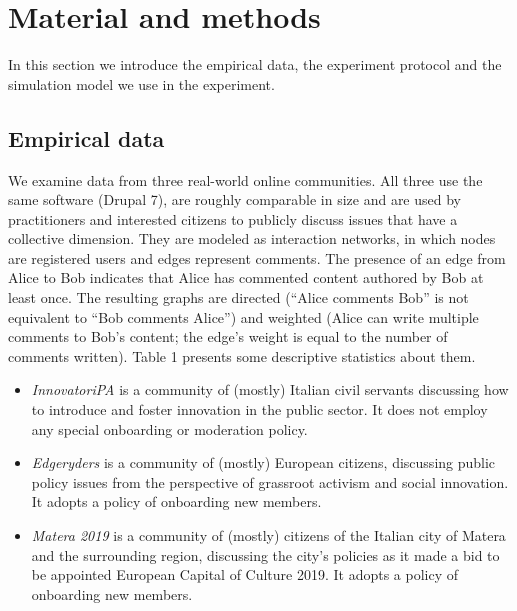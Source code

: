 \section{Material and methods}

In this section we introduce the empirical data, the experiment protocol and the simulation model we use in the experiment. 

\subsection{Empirical data}

We examine data from three real-world online communities. All three use the same software (Drupal 7), are roughly comparable in size and are used by practitioners and interested citizens to publicly discuss issues that have a collective dimension. They are modeled as interaction networks, in which nodes are registered users and edges represent comments. The presence of an edge from Alice to Bob indicates that Alice has commented content authored by Bob at least once.  The resulting graphs are directed (``Alice comments Bob'' is not equivalent to ``Bob comments Alice'') and weighted (Alice can write multiple comments to Bob's content; the edge's weight is equal to the number of comments written). Table 1 presents some descriptive statistics about them. 

\begin{itemize}
\item \emph{InnovatoriPA} is a community of (mostly) Italian civil servants discussing how to introduce and foster innovation in the public sector. It does not employ any special onboarding or moderation policy.
\item \emph{Edgeryders} is a community of (mostly) European citizens, discussing public policy issues from the perspective of grassroot activism and social innovation. It adopts a policy of onboarding new members.
\item \emph{Matera 2019} is a community of (mostly) citizens of the Italian city of Matera and the surrounding region, discussing the city's policies as it made a bid to be appointed European Capital of Culture 2019. It adopts a policy of onboarding new members.
\end{itemize}


